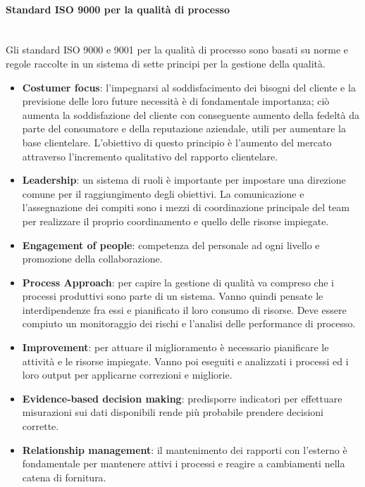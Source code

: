 \paragraph{Standard ISO 9000 per la qualità di processo}\label{sec:iso9000} \mbox{}\\
Gli standard ISO 9000 e 9001 per la qualità di processo sono basati su norme e regole raccolte in un sistema di sette principi per la gestione della qualità.
\begin{itemize}
	\item \textbf{Costumer focus}: l'impegnarsi al soddisfacimento dei bisogni del cliente e la previsione delle loro future necessità è di fondamentale importanza; ciò aumenta la soddisfazione del cliente con conseguente aumento della fedeltà da parte del consumatore e della reputazione aziendale, utili per aumentare la base clientelare. L'obiettivo di questo principio è l'aumento del mercato attraverso l'incremento qualitativo del rapporto clientelare. 
	\item \textbf{Leadership}: un sistema di ruoli è importante per impostare una direzione comune per il raggiungimento degli obiettivi. La comunicazione e l'assegnazione dei compiti sono i mezzi di coordinazione principale del team per realizzare il proprio coordinamento e quello delle risorse impiegate.
	\item \textbf{Engagement of people}: competenza del personale ad ogni livello e promozione della collaborazione.
	\item \textbf{Process Approach}: per capire la gestione di qualità va compreso che i processi produttivi sono parte di un sistema. Vanno quindi pensate le interdipendenze fra essi e pianificato il loro consumo di risorse. Deve essere compiuto un monitoraggio dei rischi e l'analisi delle performance di processo.
	\item \textbf{Improvement}: per attuare il miglioramento è necessario pianificare le attività e le risorse impiegate. Vanno poi eseguiti e analizzati i processi ed i loro output per applicarne correzioni e migliorie.
	\item \textbf{Evidence-based decision making}: predisporre indicatori per effettuare misurazioni sui dati disponibili rende più probabile prendere decisioni corrette.
	\item \textbf{Relationship management}: il mantenimento dei rapporti con l'esterno è fondamentale per mantenere attivi i processi e reagire a cambiamenti nella catena di fornitura.
\end{itemize}


